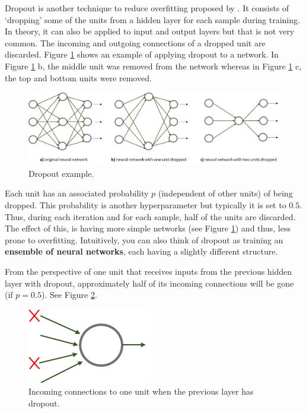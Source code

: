 \documentclass[
  11pt,
]{krantz}
\begin{document}
Dropout is another technique to reduce overfitting proposed by \citet{srivastava14}. It consists of `dropping' some of the units from a hidden layer for each sample during training. In theory, it can also be applied to input and output layers but that is not very common. The incoming and outgoing connections of a dropped unit are discarded. Figure \ref{fig:imgDropout} shows an example of applying dropout to a network. In Figure \ref{fig:imgDropout} b, the middle unit was removed from the network whereas in Figure \ref{fig:imgDropout} c, the top and bottom units were removed.

\begin{figure}

{\centering \includegraphics[width=1\linewidth]{images/nn_dropout} 

}

\caption{Dropout example.}\label{fig:imgDropout}
\end{figure}

Each unit has an associated probability \(p\) (independent of other units) of being dropped. This probability is another hyperparameter but typically it is set to \(0.5\). Thus, during each iteration and for each sample, half of the units are discarded. The effect of this, is having more simple networks (see Figure \ref{fig:imgDropout}) and thus, less prone to overfitting. Intuitively, you can also think of dropout as training an \textbf{ensemble of neural networks}, each having a slightly different structure.

From the perspective of one unit that receives inputs from the previous hidden layer with dropout, approximately half of its incoming connections will be gone (if \(p=0.5\)). See Figure \ref{fig:dropoutUnit}.

\begin{figure}

{\centering \includegraphics[width=0.2\linewidth]{images/nn_dropout_unit} 

}

\caption{Incoming connections to one unit when the previous layer has dropout.}\label{fig:dropoutUnit}
\end{figure}
\end{document}
